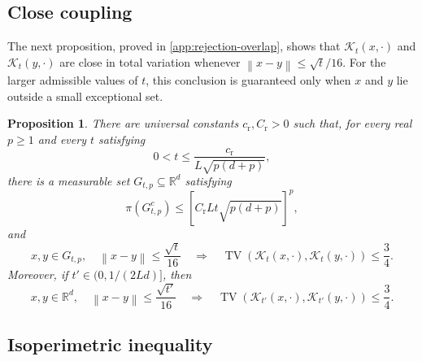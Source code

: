 \documentclass[11pt]{article}
\newtheorem{proposition}[proposition]{Proposition}
\newcommand{\R}{\mathbb R}
\newcommand{\TV}{\operatorname{TV}}
\newcommand{\cK}{\mathcal K}
\newcommand{\norm}[1]{\left\lVert #1\right\rVert}
\newcommand{\1}{\mathbf 1}
\begin{document}
	\subsection{Close coupling}
	
	The next proposition, proved in \cref{app:rejection-overlap}, shows that
	$\cK_t(x,\cdot)$ and $\cK_t(y,\cdot)$ are close in total variation whenever
	$\norm{x-y}\leq\sqrt{t}/16$.  For the larger admissible values of $t$, this
	conclusion is guaranteed only when $x$ and $y$ lie outside a small exceptional
	set.
	
	\begin{proposition} \label{prop:overlap}
		There are universal constants \(c_{\mathrm r},C_{\mathrm r}>0\) such
		that, for every real \(p\geq 1\) and every $t$ satisfying
		\begin{equation}\label{eq:overlap-step-condition}
			0<t\leq
			\frac{c_{\mathrm r}}{L\sqrt{p(d+p)}},
		\end{equation}
		there is a measurable set \(G_{t,p}\subseteq\R^d\) satisfying 
		\begin{equation}\label{eq:overlap-exceptional}
			\pi(G_{t,p}^c)
			\leq
			\left[C_{\mathrm r}Lt\sqrt{p(d+p)}\right]^p,
		\end{equation}
		and 
		\begin{equation*}
			x,y\in G_{t,p},\quad
			\norm{x-y}\leq\frac{\sqrt{t}}{16}
			\quad\Longrightarrow\quad
			\TV(\cK_t(x,\cdot),\cK_t(y,\cdot))\leq\frac34.
		\end{equation*}
		Moreover, if $t' \in (0,1/(2Ld)]$, then
		\[
		x,y\in \R^d,\quad
		\norm{x-y}\leq\frac{\sqrt{ t'}}{16}
		\quad\Longrightarrow\quad
		\TV(\cK_{t'}(x,\cdot),\cK_{t'}(y,\cdot))\leq\frac34.
		\]
	\end{proposition}
	
	
	\subsection{Isoperimetric inequality}\label{ssec:isoperimetry}
	
\end{document}
